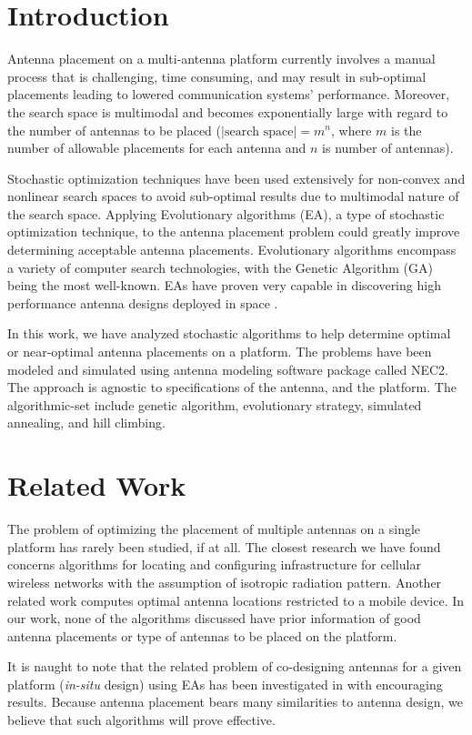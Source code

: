 \documentclass[conference]{IEEEtran}
\begin{document}
\section{Introduction}
Antenna placement on a multi-antenna platform currently involves a manual process that is challenging, time consuming, and may result in sub-optimal placements leading to lowered communication systems' performance. Moreover, the search space is multimodal and becomes exponentially large with regard to the number of antennas to be placed ($|\text{search space}| = m^n$, where $m$ is the number of allowable placements for each antenna and $n$ is number of antennas). 

Stochastic optimization techniques have been used extensively for non-convex and nonlinear search spaces to avoid sub-optimal results due to multimodal nature of the search space. Applying Evolutionary algorithms (EA), a type of stochastic optimization technique, to the antenna placement problem could greatly improve determining acceptable antenna placements. Evolutionary algorithms encompass a variety of computer search technologies, with the Genetic Algorithm (GA) being the most well-known. EAs have proven very capable in discovering high performance antenna designs deployed in space \cite{lohn2005evolutionary}. 

In this work, we have analyzed stochastic algorithms to help determine optimal or near-optimal antenna placements on a platform. The problems have been modeled and simulated using antenna modeling software package called NEC2. The approach is agnostic to specifications of the antenna, and the platform. The algorithmic-set include genetic algorithm, evolutionary strategy, simulated annealing, and hill climbing.

\section{Related Work}
\label{sec:related}
The problem of optimizing the placement of multiple antennas on a single platform has rarely been studied, if at all.  The closest research we have found concerns algorithms for locating and configuring infrastructure for cellular wireless networks with the assumption of isotropic radiation pattern. Another related work computes optimal antenna locations restricted to a mobile device. In our work, none of the algorithms discussed have prior information of good antenna placements or type of antennas to be placed on the platform.

It is naught to note that the related problem of co-designing antennas for a given platform ({\em in-situ} design) using EAs has been investigated in \cite{linden2000wire} with encouraging results. Because antenna placement bears many similarities to antenna design, we believe that such algorithms will prove effective.
\end{document}
